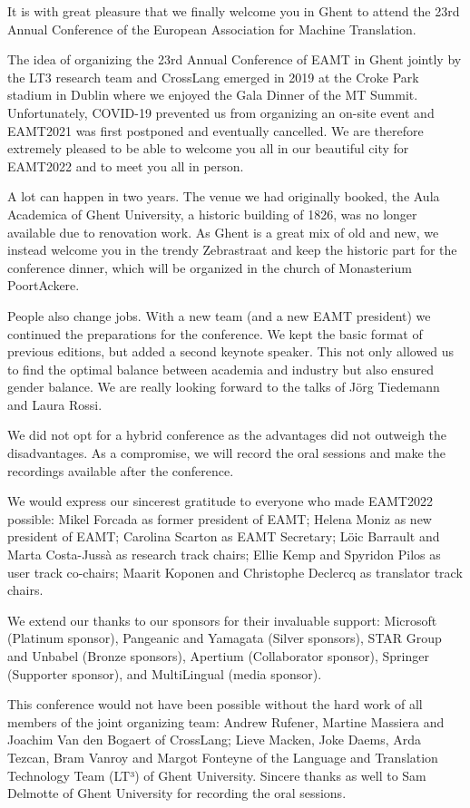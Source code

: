 \documentclass[a4paper,11pt,twoside]{book}
\begin{document}
\begin{onehalfspacing}
It is with great pleasure that we finally welcome you in Ghent to attend the 23rd Annual Conference of the European Association for Machine Translation.
 
The idea of organizing the 23rd Annual Conference of EAMT in Ghent jointly by the LT3 research team and CrossLang emerged in 2019 at the Croke Park stadium in Dublin where we enjoyed the Gala Dinner of the MT Summit. Unfortunately, COVID-19 prevented us from organizing an on-site event and EAMT2021 was first postponed and eventually cancelled. We are therefore extremely pleased to be able to welcome you all in our beautiful city for EAMT2022 and to meet you all in person.
 
A lot can happen in two years. The venue we had originally booked, the Aula Academica of Ghent University, a historic building of 1826, was no longer available due to renovation work. As Ghent is a great mix of old and new, we instead welcome you in the trendy Zebrastraat and keep the historic part for the conference dinner, which will be organized in the church of Monasterium PoortAckere. 
 
People also change jobs. With a new team (and a new EAMT president) we continued the preparations for the conference. We kept the basic format of previous editions, but added a second keynote speaker. This not only allowed us to find the optimal balance between academia and industry but also ensured gender balance. We are really looking forward to the talks of Jörg Tiedemann and Laura Rossi.
 
We did not opt for a hybrid conference as the advantages did not outweigh the disadvantages. As a compromise, we will record the oral sessions and make the recordings available after the conference. 
 
We would express our sincerest gratitude to everyone who made EAMT2022 possible: Mikel Forcada as former president of EAMT; Helena Moniz as new president of EAMT; Carolina Scarton as EAMT Secretary; Löic Barrault and Marta Costa-Jussà as research track chairs; Ellie Kemp and Spyridon Pilos as user track co-chairs; Maarit Koponen and Christophe Declercq as translator track chairs.  
 
We extend our thanks to our sponsors for their invaluable support: Microsoft (Platinum sponsor), Pangeanic and Yamagata (Silver sponsors), STAR Group and Unbabel (Bronze sponsors), Apertium (Collaborator sponsor), Springer (Supporter sponsor), and MultiLingual (media sponsor).
 
This conference would not have been possible without the hard work of all members of the joint organizing team: Andrew Rufener, Martine Massiera and Joachim Van den Bogaert of CrossLang; Lieve Macken, Joke Daems, Arda Tezcan, Bram Vanroy and Margot Fonteyne of the Language and Translation Technology Team (LT³) of Ghent University. Sincere thanks as well to Sam Delmotte of Ghent University for recording the oral sessions.

\end{onehalfspacing}
\end{document}
